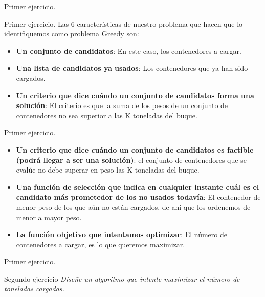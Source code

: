 \documentclass[10pt, xcolor=table]{beamer}
\begin{document}
\begin{frame}[fragile]{Primer ejercicio. }
	
\end{frame}

\begin{frame}[fragile]{Primer ejercicio. }
	Las 6 características de nuestro problema que hacen que lo identifiquemos como problema Greedy son:
	\begin{itemize}
		\item \textbf{Un conjunto de candidatos}: En este caso, los contenedores a cargar.
		\item \textbf{Una lista de candidatos ya usados}: Los contenedores que ya han sido cargados.
		\item \textbf{Un criterio que dice cuándo un conjunto de candidatos forma una solución}: El criterio es que la suma de los pesos de un conjunto de contenedores no sea superior a las K toneladas del buque.
	\end{itemize}
	
\end{frame}

\begin{frame}[fragile]{Primer ejercicio. }
	\begin{itemize}
		\item \textbf{Un criterio que dice cuándo un conjunto de candidatos es factible (podrá llegar a ser una solución)}: el conjunto de contenedores que se evalúe no debe superar en peso las K toneladas del buque.
		\item \textbf{Una función de selección que indica en cualquier instante cuál es el candidato más prometedor de los no usados todavía}: El contenedor de menor peso de los que aún no están cargados, de ahí que los ordenemos de menor a mayor peso.
		\item \textbf{La función objetivo que intentamos optimizar}: El número de contenedores a cargar, es lo que queremos maximizar.
	\end{itemize}
	
\end{frame}

\begin{frame}[fragile]{Primer ejercicio. }
\end{frame}
	
\begin{frame}[fragile]{Segundo ejercicio}
	\textit{Diseñe un algoritmo que intente maximizar el número de toneladas cargadas.}
\end{frame}
\end{document}
